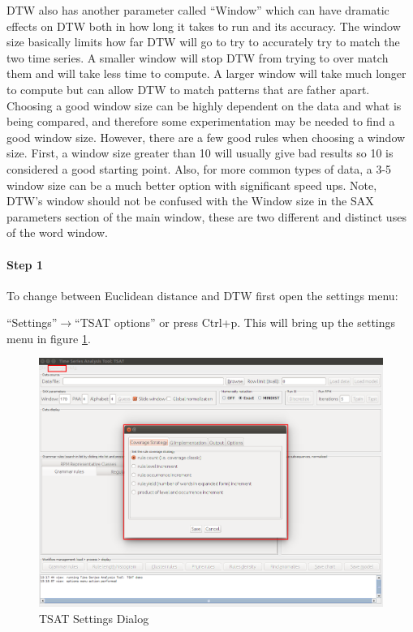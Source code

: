 \documentclass[titlepage, letterpaper, 12pt]{article}
\begin{document}
DTW also has another parameter called ``Window'' which can have dramatic effects on DTW both in how long it takes to run and its accuracy. The window size basically limits how far DTW will go to try to accurately try to match the two time series. A smaller window will stop DTW from trying to over match them and will take less time to compute. A larger window will take much longer to compute but can allow DTW to match patterns that are father apart. Choosing a good window size can be highly dependent on the data and what is being compared, and therefore some experimentation may be needed to find a good window size. However, there are a few good rules when choosing a window size. First, a window size greater than 10 will usually give bad results so 10 is considered a good starting point. Also, for more common types of data, a 3-5 window size can be a much better option with significant speed ups. Note, DTW's window should not be confused with the Window size in the SAX parameters section of the main window, these are two different and distinct uses of the word window. 

\paragraph{Step 1}
To change between Euclidean distance and DTW first open the settings menu:

``Settings''$\rightarrow$``TSAT options'' or press Ctrl+p. This will bring up the settings menu in figure \ref{fig:TSAT-settings-dialog}.

\begin{figure}[H]
	\includegraphics[width=\textwidth]{TSAT-settings-dialog}
	\caption{TSAT Settings Dialog}
	\label{fig:TSAT-settings-dialog}
\end{figure}
\end{document}
